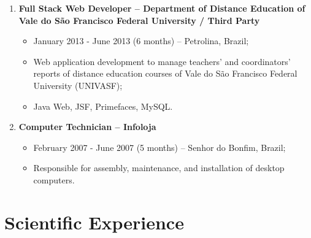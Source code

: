 \documentclass[10pt]{article}
\begin{document}
\begin{enumerate}
	\item \textbf{Full Stack Web Developer -- Department of Distance Education of Vale do São Francisco Federal University / Third Party}
	\begin{itemize}
		\item January 2013 - June 2013 (6 months) -- Petrolina, Brazil;
		\item Web application development to manage teachers' and coordinators' reports of distance education courses of Vale do São Francisco Federal University (UNIVASF);
		\item Java Web, JSF, Primefaces, MySQL.
	\end{itemize}

	\item \textbf{Computer Technician -- Infoloja}
	\begin{itemize}
		\item February 2007 - June 2007 (5 months) -- Senhor do Bonfim, Brazil;
		\item Responsible for assembly, maintenance, and installation of desktop computers.
	\end{itemize}

\end{enumerate}


\section*{Scientific Experience}
\end{document}
